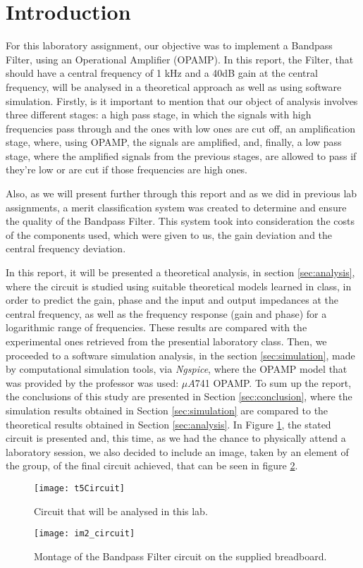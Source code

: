 \newpage
\section{Introduction}
\label{sec:introduction}

For this laboratory assignment, our objective was to implement a Bandpass Filter, using an Operational Amplifier (OPAMP). In this report, the Filter, that should have a central frequency of 1 kHz and a 40dB gain at the central frequency, will be analysed in a theoretical approach as well as using software simulation. Firstly, is it important to mention that our object of analysis involves three different stages: a high pass stage, in which the signals with high frequencies pass through and the ones with low ones are cut off, an amplification stage,  where, using OPAMP, the signals are amplified, and, finally, a low pass stage, where the amplified signals from the previous stages, are allowed to pass if they're low or are cut if those frequencies are high ones. 

Also, as we will present further through this report and as we did in previous lab assignments, a merit classification system was created to determine and ensure the quality of the Bandpass Filter. This system took into consideration the costs of the components used, which were given to us, the gain deviation and the central frequency deviation. 

In this report, it will be presented a theoretical analysis, in section \ref{sec:analysis}, where the circuit is studied using suitable theoretical models learned in class, in order to predict the gain, phase and the input and output impedances at the central frequency, as well as the frequency response (gain and phase) for a logarithmic range of frequencies. These results are compared with the experimental ones retrieved from the presential laboratory class. Then, we proceeded to a software simulation analysis, in the section \ref{sec:simulation}, made by computational simulation tools, via \textit{Ngspice}, where the OPAMP model that was provided by the professor was used: $\mu A$741 OPAMP.  To sum up the report, the conclusions of this study are presented in Section \ref{sec:conclusion}, where the simulation results obtained in Section \ref{sec:simulation} are compared to the theoretical results obtained in Section \ref{sec:analysis}.
In Figure \ref{fig:circuit}, the stated circuit is presented and, this time, as we had the chance to physically attend a laboratory session, we also decided to include an image, taken by an element of the group, of the final circuit achieved, that can be seen in figure \ref{fig:circuit.photo}.


\begin{figure}[h] \centering
	\texttt{[image: t5Circuit]}
	\caption{Circuit that will be analysed in this lab.}
	\label{fig:circuit}
\end{figure}

\begin{figure}[h] \centering
	\texttt{[image: im2\_circuit]}
	\caption{Montage of the Bandpass Filter circuit on the supplied breadboard.}
	\label{fig:circuit.photo}
\end{figure}

